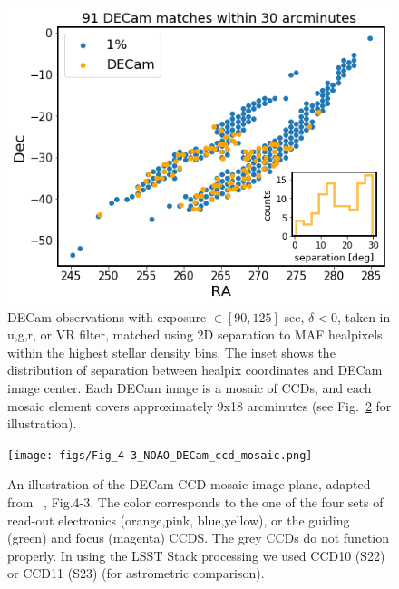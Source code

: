 \documentclass[DM,lsstdraft,toc,usenatbib]{lsstdoc}
\begin{document}
\begin{figure}
\includegraphics[width=1.0\columnwidth]{figs/Illustrate_top_1_perc_DECam_matches.png}
\caption{DECam observations with exposure $\in [90,125] $ sec, $\delta < 0$, taken in  u,g,r, or VR filter, matched using 2D separation to MAF healpixels within the highest stellar density bins. The inset shows the distribution of separation between healpix coordinates and DECam image center. Each DECam image is a mosaic of CCDs, and each mosaic element covers approximately 9x18 arcminutes (see Fig.~\ref{fig:decam_mosaic_ccd} for illustration). }
\label{fig:decam_matches_top}
\end{figure} 


\begin{figure}
\texttt{[image: figs/Fig\_4-3\_NOAO\_DECam\_ccd\_mosaic.png]}
\caption{An illustration of the DECam CCD mosaic image plane, adapted from ~\citep{shaw2015}, Fig.4-3. The color corresponds to the one of the four sets of read-out electronics (orange,pink, blue,yellow), or the guiding (green) and focus (magenta) CCDS.  The grey CCDs do not function properly. In using the LSST Stack processing we used CCD10 (S22)  or CCD11 (S23) (for astrometric comparison).   }
\label{fig:decam_mosaic_ccd}
\end{figure} 
\end{document}
